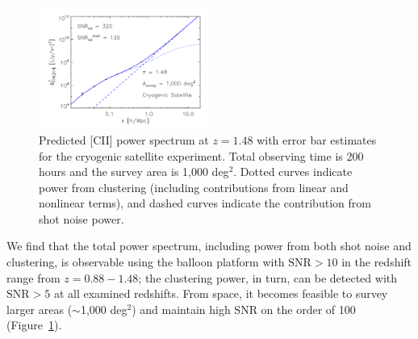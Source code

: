 \documentclass[iop]{emulateapj}
\begin{document}
\begin{figure}[h]
\centering
\includegraphics[width = 0.5\textwidth]{ps_cii_z148_asurvey1000deg2_space}
\caption{Predicted [CII] power spectrum at $z=1.48$ with error bar estimates for the cryogenic satellite experiment. Total observing time is 200 hours and the survey area is 1,000 deg$^2$. Dotted curves indicate power from clustering (including contributions from linear and nonlinear terms), and dashed curves indicate the contribution from shot noise power.}
\label{fig:pcii_z1p48_space}
\end{figure}

We find that the total power spectrum, including power from both shot noise and clustering, is observable using the balloon platform with $\textrm{SNR}>10$ in the redshift range from $z = 0.88-1.48$; the clustering power, in turn, can be detected with $\textrm{SNR}>5$ at all examined redshifts. From space, it becomes feasible to survey larger areas ($\sim$1,000 deg$^2$) and maintain high SNR on the order of 100 (Figure~\ref{fig:pcii_z1p48_space}). 

\end{document}
